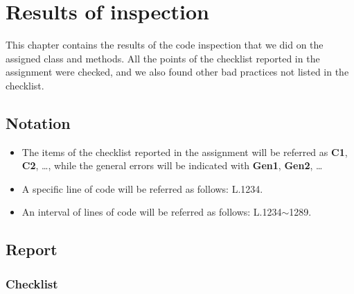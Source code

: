 \chapter{Results of inspection}

This chapter contains the results of the code inspection that we did on the assigned class and methods. All the points of the checklist reported in the assignment were checked, and we also found other bad practices not listed in the checklist.

\section{Notation}
\begin{itemize}
	\item The items of the checklist reported in the assignment will be referred as \textbf{C1}, \textbf{C2}, \ldots, while the general errors will be indicated with \textbf{Gen1}, \textbf{Gen2}, \ldots
	\item A specific line of code will be referred as follows: L.1234.
	\item An interval of lines of code will be referred as follows: L.1234$\sim$1289.
\end{itemize}

\section{Report}

\subsection{Checklist}

